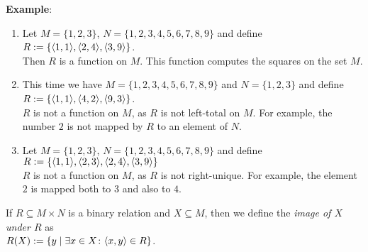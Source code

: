 \noindent
\textbf{Example}: 
\begin{enumerate}
\item Let $M = \{1,2,3\}$, $N = \{1,2,3,4,5,6,7,8,9\}$ and define\\[0.2cm]
      \hspace*{1.3cm} $R := \{ \pair(1,1),\pair(2,4),\pair(3,9) \}$. \\[0.2cm]
      Then $R$ is a function on  $M$.  This function computes the squares on the set $M$.
\item This time we have  $M = \{1,2,3,4,5,6,7,8,9\}$ and $N = \{1,2,3\}$ and define \\[0.2cm]
      \hspace*{1.3cm} $R := \{ \pair(1,1),\pair(4,2),\pair(9,3) \}$. \\[0.2cm]
      $R$ is not a function on  $M$, as  $R$ is not left-total on $M$.  
      For example, the number  $2$ is not mapped by $R$ to an element of  
      $N$.
\item Let  $M = \{1,2,3\}$, $N = \{1,2,3,4,5,6,7,8,9\}$ and define \\[0.2cm]
      \hspace*{1.3cm} $R := \{ \pair(1,1),\pair(2,3),\pair(2,4),\pair(3,9) \}$ \\[0.2cm]
       $R$ is not a function on $M$, as $R$ is not right-unique.
       For example, the element $2$ is mapped both to  $3$ and also to $4$.
\end{enumerate}
If $R \subseteq M \times N$ is a binary  relation and  $X \subseteq M$, then we define the
 \emph{image of  $X$ under $R$} as \\[0.2cm]
\hspace*{1.3cm} $R(X) := \{ y \mid \exists x \in X \colon \pair(x,y) \in R \}$. 

